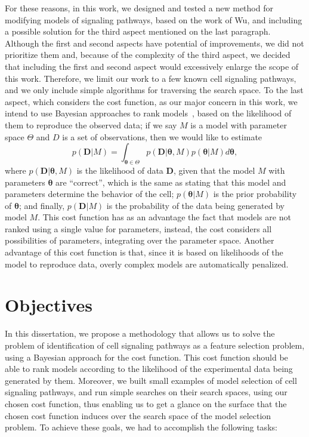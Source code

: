 For these reasons, in this work, we designed and tested a new method for 
modifying models of signaling pathways, based on the work of Wu, and 
including a possible solution for the third aspect mentioned on the last 
paragraph. Although the first and second aspects have potential of 
improvements, we did not prioritize them and, because of the 
complexity of the third aspect, we decided that including the first and 
second aspect would excessively enlarge the scope of this work.
Therefore, we limit our work to a few known cell signaling pathways, and
we only include simple algorithms for traversing the search space. To
the last aspect, which considers the cost function, as our major 
concern in this work, we intend to use Bayesian approaches to rank 
models~\cite{Vyshemirsky2007}, based on the likelihood of them to 
reproduce the observed data; if we say $M$ is a model with parameter 
space $\Theta$ and $D$ is a set of observations, then we would like to 
estimate 
\begin{equation*}
    p ({\bm D}|M) = \int_{{\bm \theta} \in \Theta} p ({\bm D} | {\bm
    \theta}, M)p({\bm \theta} | M)d{\bm \theta}, 
\end{equation*}
where $p ({\bm D}|{\bm \theta}, M)$ is the likelihood of data ${\bm D}$,
given that the model $M$ with parameters ${\bm \theta}$ are ``correct'',
which is the same as stating that this model and parameters determine
the behavior of the cell; $p({\bm \theta} | M)$ is the prior
probability of ${\bm \theta}$; and finally, $p ({\bm D} | M)$ is the
probability of the data being generated by model $M$. This cost function
has as an advantage the fact that models are not ranked using a single
value for parameters, instead, the cost considers all possibilities of
parameters, integrating over the parameter space. Another advantage of
this cost function is that, since it is based on likelihoods of the
model to reproduce data, overly complex models are automatically
penalized.

\section{Objectives}
In this dissertation, we propose a methodology that allows us 
to solve the problem of identification of cell signaling pathways as a 
feature selection problem, using a Bayesian approach for the cost
function. This cost function should be able to rank models according to
the likelihood of the experimental data being generated by them. Moreover,
we built small examples of model selection of cell signaling pathways, and
run simple searches on their search spaces, using our chosen cost 
function, thus enabling us to get a glance on the
surface that the chosen cost function induces over the search space of
the model selection problem. To achieve these goals, we had to
accomplish the following tasks:

